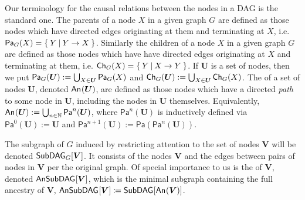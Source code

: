 Our terminology for the causal relations between the nodes in a DAG is the standard one. The parents of a node $X$ in a given graph $G$ are defined as those nodes which have directed edges originating at them and terminating at $X$, i.e. $\Pa[G]{X} = \{\:Y\:|\:Y\to X\:\}$.  Similarly the children of a node $X$ in a given graph $G$ are defined as those nodes which have have directed edges originating at $X$ and terminating at them, i.e. $\Ch[G]{X} = \{\:Y\:|\: X\to Y\:\}$. If $\bm{U}$ is a set of nodes, then we put $\Pa[G]{\bm{U}} := \bigcup_{X\in\bm{U}} \Pa[G]{X}$ and $\Ch[G]{\bm{U}} := \bigcup_{X\in\bm{U}} \Ch[G]{X}$.  The  of a set of nodes $\bm{U}$, denoted $\An{\bm{U}}$, are defined as those nodes which have a directed \emph{path} to some node in $\bm{U}$, including the nodes in $\bm{U}$ themselves. Equivalently, $\An{\bm{U}} := \bigcup_{n\in\mathbb{N}} \mathsf{Pa}^n(\bm{U})$, where $\mathsf{Pa}^n(\bm{U})$ is inductively defined via $\mathsf{Pa}^0(\bm{U}) := \bm{U}$ and $\mathsf{Pa}^{n+1}(\bm{U}) := \mathsf{Pa}(\mathsf{Pa}^n(\bm{U}))$. 

The subgraph of $G$ induced by restricting attention to the set of nodes $\bm{V}$ will be denoted $\subgraph[G]{\bm{V}}$.
It consists of the nodes $\bm{V}$ and the edges between pairs of nodes in $\bm{V}$ per the original graph. Of special importance to us is the 
 of $\bm{V}$, denoted $\ansubgraph{\bm{V}}$, which is the minimal subgraph containing the full ancestry of $\bm{V}$, $\ansubgraph{\bm{V}}\coloneqq\subgraph{\An{\bm{V}}}$. 


